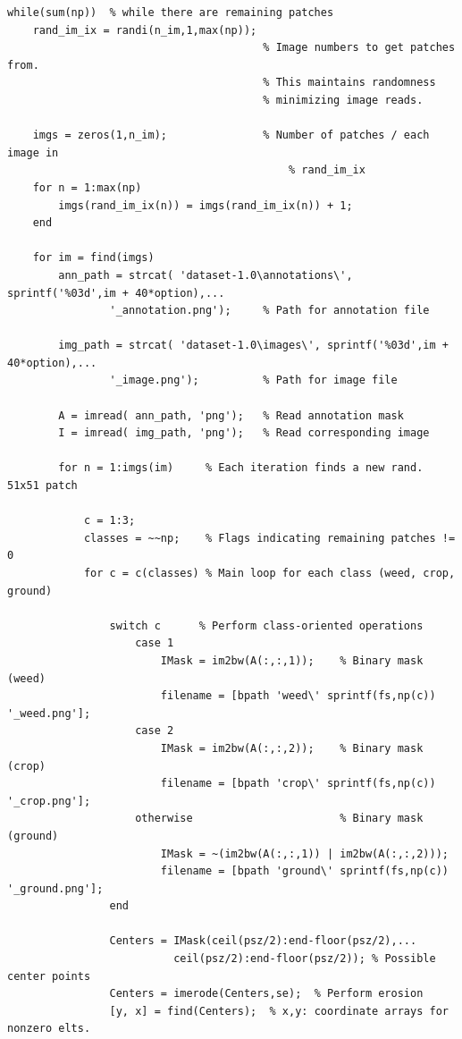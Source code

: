 \documentclass[]{report}
\begin{document}
\begin{lstlisting}
while(sum(np))  % while there are remaining patches 
    rand_im_ix = randi(n_im,1,max(np));  
                                        % Image numbers to get patches from.
                                        % This maintains randomness
                                        % minimizing image reads.
                                       
    imgs = zeros(1,n_im);               % Number of patches / each image in
                                            % rand_im_ix
    for n = 1:max(np)
        imgs(rand_im_ix(n)) = imgs(rand_im_ix(n)) + 1;
    end

    for im = find(imgs)
        ann_path = strcat( 'dataset-1.0\annotations\', sprintf('%03d',im + 40*option),...
                '_annotation.png');     % Path for annotation file
            
        img_path = strcat( 'dataset-1.0\images\', sprintf('%03d',im + 40*option),...
                '_image.png');          % Path for image file

        A = imread( ann_path, 'png');   % Read annotation mask
        I = imread( img_path, 'png');   % Read corresponding image   

        for n = 1:imgs(im)     % Each iteration finds a new rand. 51x51 patch

            c = 1:3;
            classes = ~~np;    % Flags indicating remaining patches != 0
            for c = c(classes) % Main loop for each class (weed, crop, ground) 
                
                switch c      % Perform class-oriented operations
                    case 1
                        IMask = im2bw(A(:,:,1));    % Binary mask (weed)
                        filename = [bpath 'weed\' sprintf(fs,np(c)) '_weed.png'];
                    case 2
                        IMask = im2bw(A(:,:,2));    % Binary mask (crop)
                        filename = [bpath 'crop\' sprintf(fs,np(c)) '_crop.png'];
                    otherwise                       % Binary mask (ground)
                        IMask = ~(im2bw(A(:,:,1)) | im2bw(A(:,:,2)));
                        filename = [bpath 'ground\' sprintf(fs,np(c)) '_ground.png'];
                end
                
                Centers = IMask(ceil(psz/2):end-floor(psz/2),...
                          ceil(psz/2):end-floor(psz/2)); % Possible center points
                Centers = imerode(Centers,se);  % Perform erosion
                [y, x] = find(Centers);  % x,y: coordinate arrays for nonzero elts.


\end{lstlisting}
\end{document}
